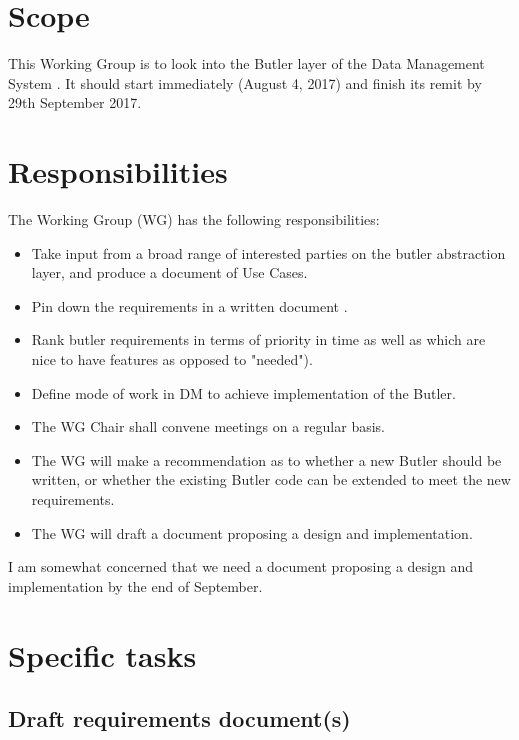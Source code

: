 \section{Scope}

This Working Group is to look into the Butler layer of the Data Management System .
It should start immediately (August 4, 2017) and finish its remit by 29th September 2017.


\section{Responsibilities}

The Working Group (WG) has the following responsibilities:

\begin{itemize}
 \item Take input from a broad range of interested parties on the butler abstraction layer, and produce a document of Use Cases.
 \item Pin down the requirements in a written document \citep{LDM-556}.
 \item Rank butler requirements in terms of priority in time as well as which are nice to have features as opposed to "needed").
 \item Define mode of work in DM to achieve implementation of the Butler.
 \item The WG Chair shall convene meetings on a regular basis.
 \item The WG will make a recommendation as to whether a new Butler should be written, or whether the existing Butler code can be extended to meet the new requirements.
 \item The WG will draft a document proposing a design and implementation.
\end{itemize}

\begin{draftnote}
  I am somewhat concerned that we need a document proposing a design and implementation by the end of September.
\end{draftnote}

\section{Specific tasks}

\subsection{Draft requirements document(s)}

